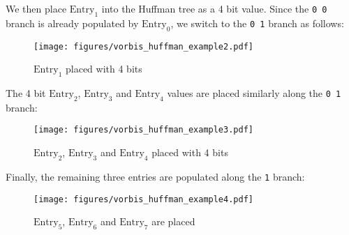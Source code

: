 \clearpage

We then place $\text{Entry}_1$ into the Huffman tree as a 4 bit value.
Since the \texttt{0 0} branch is already populated by $\text{Entry}_0$,
we switch to the \texttt{0 1} branch as follows:
\begin{figure}[h]
\texttt{[image: figures/vorbis\_huffman\_example2.pdf]}
\caption{$\text{Entry}_1$ placed with 4 bits}
\end{figure}
\par
\noindent
The 4 bit $\text{Entry}_2$, $\text{Entry}_3$ and $\text{Entry}_4$
values are placed similarly along the \texttt{0 1} branch:
\begin{figure}[h]
\texttt{[image: figures/vorbis\_huffman\_example3.pdf]}
\caption{$\text{Entry}_2$, $\text{Entry}_3$ and $\text{Entry}_4$ placed with 4 bits}
\end{figure}
\par
\noindent
Finally, the remaining three entries are populated along the \texttt{1} branch:
\begin{figure}[h]
\texttt{[image: figures/vorbis\_huffman\_example4.pdf]}
\caption{$\text{Entry}_5$, $\text{Entry}_6$ and $\text{Entry}_7$ are placed}
\end{figure}

\clearpage

